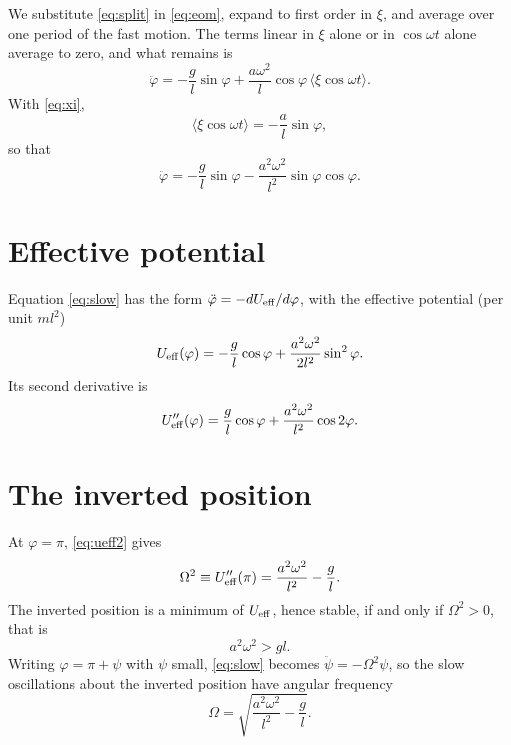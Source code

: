 \documentclass{article}
\begin{document}
We substitute \eqref{eq:split} in \eqref{eq:eom}, expand to first order in $\xi$, and average over one period of the fast motion. The terms linear in $\xi$ alone or in $\cos\omega t$ alone average to zero, and what remains is
\begin{equation}
  \ddot\varphi = -\frac{g}{l}\sin\varphi + \frac{a\omega^2}{l}\cos\varphi\,\langle\xi\cos\omega t\rangle .
  \label{eq:slow-avg}
\end{equation}
With \eqref{eq:xi},
\begin{equation}
  \langle\xi\cos\omega t\rangle = -\frac{a}{l}\sin\varphi ,
  \label{eq:corr}
\end{equation}
so that
\begin{equation}
  \ddot\varphi = -\frac{g}{l}\sin\varphi - \frac{a^2\omega^2}{l^2}\sin\varphi\cos\varphi .
  \label{eq:slow}
\end{equation}

\section{Effective potential}
Equation \eqref{eq:slow} has the form $\ddot\varphi = -dU_{\rm eff}/d\varphi$, with the effective potential (per unit $ml^2$)
\begin{equation}
  U_{\rm eff}(\varphi) = -\frac{g}{l}\cos\varphi + \frac{a^2\omega^2}{2l^2}\sin^2\varphi .
  \label{eq:ueff}
\end{equation}
Its second derivative is
\begin{equation}
  U_{\rm eff}''(\varphi) = \frac{g}{l}\cos\varphi + \frac{a^2\omega^2}{l^2}\cos 2\varphi .
  \label{eq:ueff2}
\end{equation}

\section{The inverted position}
At $\varphi = \pi$, \eqref{eq:ueff2} gives
\begin{equation}
  \Omega^2 \equiv U_{\rm eff}''(\pi) = \frac{a^2\omega^2}{l^2} - \frac{g}{l} .
  \label{eq:Omega2}
\end{equation}
The inverted position is a minimum of $U_{\rm eff}$, hence stable, if and only if $\Omega^2>0$, that is
\begin{equation}
  a^2\omega^2 > gl .
  \label{eq:condition}
\end{equation}
Writing $\varphi = \pi + \psi$ with $\psi$ small, \eqref{eq:slow} becomes $\ddot\psi = -\Omega^2\psi$, so the slow oscillations about the inverted position have angular frequency
\begin{equation}
  \Omega = \sqrt{\frac{a^2\omega^2}{l^2} - \frac{g}{l}} .
  \label{eq:freq}
\end{equation}
\end{document}
